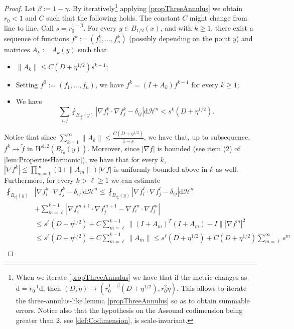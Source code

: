 \documentclass[12pt,a4paper,reqno]{amsart}
\renewcommand{\leq}{\leqslant}
\renewcommand{\geq}{\geqslant}
\renewcommand{\d}{\ensuremath{\mathrm d}}
\renewcommand{\tilde}{\widetilde}
\begin{document}
\begin{proof}
    Let $\beta:=1-\gamma$. By iteratively\footnote{When we iterate \cref{propThreeAnnulus} we have that if the metric changes as $\tilde{\mathrm{d}}=r_0^{-1}\mathrm{d}$, then $(D,\eta)\rightarrow (r_0^{1-\beta}(D+\eta^{1/2}),r_0^2\eta)$. This allows to iterate the three-annulus-like lemma \cref{propThreeAnnulus} so as to obtain summable errors. Notice also that the hypothesis on the Assouad codimension being greater than 2, see \cref{def:Codimension}, is scale-invariant.} applying \cref{propThreeAnnulus} we obtain $r_0<1$ and $C$ such that the following holds. The constant $C$ might change from line to line. Call $s=r_0^{1-\beta}$. For every $y\in B_{1/2}(x)$, and with $k\geq 1$, there exist a sequence of functions $f^k:=(f_1^k,\ldots,f_n^k)$ (possibly depending on the point $y$) and matrices $A_k:=A_k(y)$ such that 
    \begin{itemize}
        \item $\|A_k\|\leq C(D+\eta^{1/2})s^{k-1}$;
        \item Setting $f^0:=(f_1,\ldots,f_n)$, we have $f^k=(I+A_k)f^{k-1}$ for every $k\geq 1$;
        \item We have 
        \[
        \sum_{i,j}\fint_{B_{r_0^k}(y)} |\nabla f^k_i\cdot \nabla f^k_j - \delta_{ij}|\d\mathcal{H}^n < s^{k}(D+\eta^{1/2}).
        \]
    \end{itemize}
    Notice that since $\sum_{k=1}^{\infty} \|A_k\|\leq \frac{C(D+\eta^{1/2})}{1-s}$, we have that, up to subsequence, $f^k\to \tilde f$ in $W^{1,2}(B_{r_0}(y))$. Moreover, since $|\nabla f|$ is bounded (see item (2) of \cref{lem:PropertiesHarmonic}), we have that for every $k$, $|\nabla f^k|\leq \prod_{m=1}^{\infty} (1+\|A_m\|)|\nabla f|$ is uniformly bounded above in $k$ as well. Furthermore, for every $k>\ell\geq 1$ we can estimate
    \[
    \begin{aligned}
        \fint_{B_{r_0^\ell}(y)} &|\nabla f^k_i\cdot\nabla f^k_j-\delta_{ij}|\d\mathcal{H}^n\leq \fint_{B_{r_0^\ell}(y)} |\nabla f^\ell_i\cdot\nabla f^\ell_j-\delta_{ij}|\d\mathcal{H}^n\\
        &+\sum_{m=\ell}^{k-1} |\nabla f^{m+1}_i\cdot\nabla f^{m+1}_j-\nabla f^m_i\cdot\nabla f^m_j| \\
        &\leq s^\ell (D+\eta^{1/2}) + C\sum_{m=\ell}^{k-1} \|(I+A_m)^T(I+A_m)-I\||\nabla f^m|^2 \\&\leq s^\ell(D+\eta^{1/2}) + C\sum_{m=\ell}^{k-1} \|A_m\| \leq s^\ell (D+\eta^{1/2}) + C(D+\eta^{1/2})\sum_{m=\ell}^{\infty} s^{m} \\

\end{aligned}\]
\end{proof}
\end{document}
